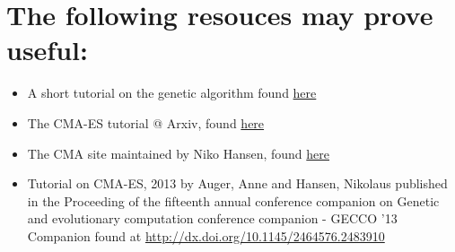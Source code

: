 \documentclass[11pt]{article}
\begin{document}
\section{The following resouces may prove useful:}
\label{sec:references}
\begin{itemize}
\item A short tutorial on the genetic algorithm found \href{http://web.cs.ucdavis.edu/\~vemuri/classes/ecs271/Genetic\%2520Algorithms\%2520Short\%2520Tutorial.htm}{here}
\item The CMA-ES tutorial @ Arxiv, found \href{https://arxiv.org/pdf/1604.00772.pdf}{here}
\item The CMA site maintained by Niko Hansen, found \href{http://cma.gforge.inria.fr/index.html}{here}
\item Tutorial on CMA-ES, 2013 by Auger, Anne and Hansen, Nikolaus published in the
Proceeding of the fifteenth annual conference companion on Genetic and
evolutionary computation conference companion - GECCO ’13 Companion found at \url{http://dx.doi.org/10.1145/2464576.2483910}
\end{itemize}
\end{document}
